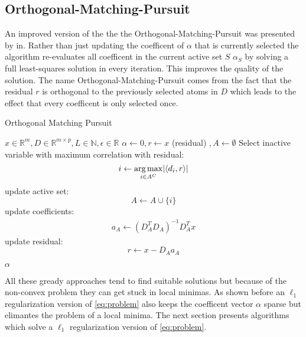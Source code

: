 \subsection{Orthogonal-Matching-Pursuit}
\label{sec:omp}

An improved version of the  the the
Orthogonal-Matching-Pursuit  was presented by
in\cite{Pati1993}. Rather than just updating the coefficent of $\alpha$ that is
currently selected  the algorithm re-evaluates all
coefficent in the current active set $S$   $\alpha_S$
by solving a full least-squares solution in every iteration. This improves the
quality of the solution.\cite{OMP} The name Orthogonal-Matching-Pursuit comes
from the fact that the residual $r$ is orthogonal to the previously selected
atoms in $D$ which leads to the effect that every coefficent is only selected
once.


\begin{algorithm}
\caption{Orthogonal Matching Pursuit}
\label{alg:omp}
\begin{algorithmic}[1]
\REQUIRE $x \in \mathbb{R}^m, D \in \mathbb{R}^{m\times p}, L \in \mathbb{N}, \epsilon \in \mathbb{R}$
\STATE $\alpha \gets 0, r \gets x $ (residual) $, A \gets \emptyset$
\STATE Select inactive variable with maximum correlation with residual: 
\begin{equation*}
i \gets \operatorname*{arg\,max}_{i \in A^C} \lvert \left<d_i,r\right> \rvert
\end{equation*}
\STATE update active set:
\begin{equation*}
 A \gets A \cup \{i\} 
\end{equation*}
\STATE update coefficients: 
\begin{align}
a_A \gets \left( D_A^T D_A \right)^{-1} D_A^T x  \label{eq:omp_update}
\end{align}
\STATE update residual:
\begin{equation*}
 r \gets x-D_Aa_A
\end{equation*}
 

\ENDFOR
\RETURN $\alpha$
\end{algorithmic}
\end{algorithm}


All these gready approaches tend to find suitable solutions but because of the
non-convex problem they can get stuck in local minimas. As shown before an
$\ell_1$ regularization version of \ref{eq:problem} also keeps the coefficent
vector $\alpha$ sparse but elimantes the problem of a local minima. The next
section presents algorithms which solve  a $\ell_1$ regularization version of
\ref{eq:problem}.



